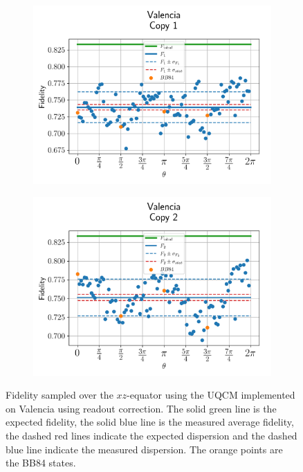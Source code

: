 \begin{figure}[H]
    \centering
    \begin{subfigure}{.45\textwidth}
      \centering
      \includegraphics[width=\textwidth]{Figures/UQCM/IBM/OnlyEquator/results_corrected_valencia_copy1.png}
    \end{subfigure}%
    \begin{subfigure}{.45\textwidth}
      \centering
      \includegraphics[width=\textwidth]{Figures/UQCM/IBM/OnlyEquator/results_corrected_valencia_copy2.png}
    \end{subfigure}
    \caption{Fidelity sampled over the $xz$-equator using the UQCM implemented on Valencia using readout correction. The solid green line is the expected fidelity, the solid blue line is the measured average fidelity, the dashed red lines indicate the expected dispersion and the dashed blue line indicate the measured dispersion. The orange points are the BB84 states.}
    \label{fig:uqcm_eq_val}
\end{figure}

